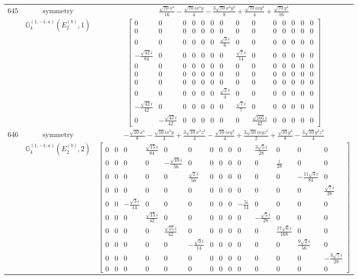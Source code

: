 \documentclass[fleqn,8pt,landscape]{jsarticle}
\begin{document}
\begin{longtable}{ccc}
$ 645 $ & $ \text{symmetry} $ & $ \frac{\sqrt{70} x^{4}}{16} - \frac{\sqrt{70} i x^{3} y}{4} - \frac{3 \sqrt{70} x^{2} y^{2}}{8} + \frac{\sqrt{70} i x y^{3}}{4} + \frac{\sqrt{70} y^{4}}{16} $ \\
$  $ & $ \mathbb{G}_{4}^{(1,-1;a)}(E_{2}^{(b)},1) $ & $ \begin{bmatrix} 0 & 0 & 0 & 0 & 0 & 0 & 0 & 0 & 0 & 0 & 0 & 0 & 0 & 0 \\ 0 & 0 & 0 & 0 & 0 & 0 & 0 & 0 & 0 & 0 & 0 & 0 & 0 & 0 \\ 0 & 0 & 0 & 0 & 0 & 0 & \frac{\sqrt{3} i}{6} & 0 & 0 & 0 & 0 & 0 & 0 & 0 \\ - \frac{\sqrt{42} i}{84} & 0 & 0 & 0 & 0 & 0 & 0 & \frac{\sqrt{7} i}{14} & 0 & 0 & 0 & 0 & 0 & 0 \\ 0 & 0 & 0 & 0 & 0 & 0 & 0 & 0 & 0 & 0 & 0 & 0 & 0 & 0 \\ 0 & 0 & 0 & 0 & 0 & 0 & 0 & 0 & 0 & 0 & 0 & 0 & 0 & 0 \\ 0 & 0 & 0 & 0 & 0 & 0 & 0 & 0 & 0 & 0 & 0 & 0 & 0 & 0 \\ 0 & 0 & 0 & 0 & 0 & 0 & \frac{\sqrt{2} i}{4} & 0 & 0 & 0 & 0 & 0 & 0 & 0 \\ - \frac{\sqrt{42} i}{42} & 0 & 0 & 0 & 0 & 0 & 0 & \frac{\sqrt{7} i}{7} & 0 & 0 & 0 & 0 & 0 & 0 \\ 0 & - \frac{\sqrt{42} i}{42} & 0 & 0 & 0 & 0 & 0 & 0 & \frac{\sqrt{105} i}{42} & 0 & 0 & 0 & 0 & 0 \end{bmatrix} $ \\ \hline
$ 646 $ & $ \text{symmetry} $ & $ - \frac{\sqrt{10} x^{4}}{8} - \frac{\sqrt{10} i x^{3} y}{4} + \frac{3 \sqrt{10} x^{2} z^{2}}{4} - \frac{\sqrt{10} i x y^{3}}{4} + \frac{3 \sqrt{10} i x y z^{2}}{2} + \frac{\sqrt{10} y^{4}}{8} - \frac{3 \sqrt{10} y^{2} z^{2}}{4} $ \\
$  $ & $ \mathbb{G}_{4}^{(1,-1;a)}(E_{2}^{(b)},2) $ & $ \begin{bmatrix} 0 & 0 & 0 & \frac{\sqrt{15} i}{84} & 0 & 0 & 0 & 0 & 0 & 0 & \frac{3 \sqrt{5} i}{28} & 0 & 0 & 0 \\ 0 & 0 & 0 & 0 & - \frac{\sqrt{10} i}{56} & 0 & 0 & 0 & 0 & 0 & 0 & \frac{i}{28} & 0 & 0 \\ 0 & 0 & 0 & 0 & 0 & \frac{\sqrt{2} i}{56} & 0 & 0 & 0 & 0 & 0 & 0 & - \frac{11 \sqrt{3} i}{84} & 0 \\ 0 & 0 & 0 & 0 & 0 & 0 & 0 & 0 & 0 & 0 & 0 & 0 & 0 & \frac{\sqrt{7} i}{28} \\ 0 & 0 & - \frac{\sqrt{3} i}{14} & 0 & 0 & 0 & 0 & 0 & 0 & - \frac{5 i}{14} & 0 & 0 & 0 & 0 \\ 0 & 0 & 0 & \frac{\sqrt{15} i}{42} & 0 & 0 & 0 & 0 & 0 & 0 & - \frac{\sqrt{5} i}{28} & 0 & 0 & 0 \\ 0 & 0 & 0 & 0 & \frac{\sqrt{15} i}{42} & 0 & 0 & 0 & 0 & 0 & 0 & \frac{17 \sqrt{6} i}{168} & 0 & 0 \\ 0 & 0 & 0 & 0 & 0 & - \frac{\sqrt{3} i}{14} & 0 & 0 & 0 & 0 & 0 & 0 & \frac{9 \sqrt{2} i}{56} & 0 \\ 0 & 0 & 0 & 0 & 0 & 0 & 0 & 0 & 0 & 0 & 0 & 0 & 0 & - \frac{3 \sqrt{7} i}{28} \\ 0 & 0 & 0 & 0 & 0 & 0 & 0 & 0 & 0 & 0 & 0 & 0 & 0 & 0 \end{bmatrix} $ \\ \hline

\end{longtable}
\end{document}
